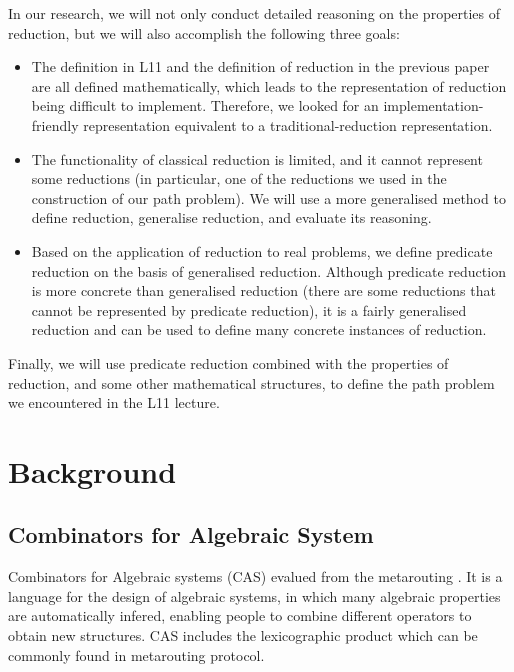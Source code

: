 \documentclass[a4paper,12pt,twoside,openright]{report}
\begin{document}
In our research, we will not only conduct detailed reasoning on the properties of reduction, but we will also accomplish the following three goals:
\begin{itemize}
  \item The definition in L11 and the definition of reduction in the previous paper are all defined mathematically, which leads to the representation of reduction being difficult to implement. Therefore, we looked for an implementation-friendly representation equivalent to a traditional-reduction representation.
  \item The functionality of classical reduction is limited, and it cannot represent some reductions (in particular, one of the reductions we used in the construction of our path problem). We will use a more generalised method to define reduction, generalise reduction, and evaluate its reasoning. 
  \item Based on the application of reduction to real problems, we define predicate reduction on the basis of generalised reduction. Although predicate reduction is more concrete than generalised reduction (there are some reductions that cannot be represented by predicate reduction), it is a fairly generalised reduction and can be used to define many concrete instances of reduction. 
\end{itemize}
Finally, we will use predicate reduction combined with the properties of reduction, and some other mathematical structures, to define the path problem we encountered in the L11 lecture.

\chapter{Background} 

%

\section{Combinators for Algebraic System}
Combinators for Algebraic systems (CAS) evalued from the metarouting \cite{griffin_metarouting_2005}. It is a language for the design of algebraic systems, in which many algebraic properties are automatically infered, enabling people to combine different operators to obtain new structures. 
CAS includes the lexicographic product \cite{gurney_lexicographic_2007} which can be commonly found in metarouting protocol.
\end{document}
